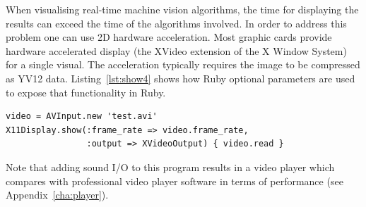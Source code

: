 \documentclass[12pt,a4paper,oneside,openright]{book}
\newcommand{\anx}[1]{Appendix~\ref{cha:#1}}
\newcommand{\lst}[1]{Listing~\ref{lst:#1}}
\begin{document}
\begin{CJK}{UTF8}{}
When visualising real-time machine vision algorithms, the time for displaying the results can exceed the time of the algorithms involved. In order to address this problem one can use \ac{2D} hardware acceleration. Most graphic cards provide hardware accelerated display (the XVideo extension of the X Window System) for a single visual. The acceleration typically requires the image to be compressed as YV12 data. \lst{show4} shows how Ruby optional parameters are used to expose that functionality in Ruby.
\lstset{language=Ruby,frame=single,numbers=none}
\begin{lstlisting}[float,caption={Hardware accelerated video output},label=lst:show4]
video = AVInput.new 'test.avi'
X11Display.show(:frame_rate => video.frame_rate,
                :output => XVideoOutput) { video.read }
\end{lstlisting}
Note that adding sound \ac{I}/\ac{O} to this program results in a video player which compares with professional video player software in terms of performance (see \anx{player}).


\end{CJK}
\end{document}
